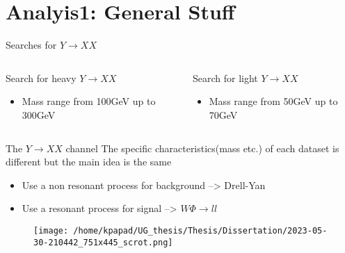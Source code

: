 \documentclass[bigger]{beamer}
\begin{document}
\section{Analyis1: General Stuff}
\label{sec:org932684b}
\begin{frame}[label={sec:org5f145da}]{Searches for \(Y \rightarrow XX\)}
\begin{columns}
\begin{column}{0.5\columnwidth}
Search for heavy \(Y \rightarrow XX\)
\begin{itemize}
\item Mass range from 100GeV up to 300GeV
\end{itemize}
\end{column}
\begin{column}{0.5\columnwidth}
Search for light \(Y \rightarrow XX\)
\begin{itemize}
\item Mass range from 50GeV up to 70GeV
\end{itemize}
\end{column}
\end{columns}
\end{frame}
\begin{frame}[label={sec:org27c5bee}]{The \(Y \rightarrow XX\) channel}
The specific characteristics(mass etc.) of each dataset  is different but the main idea is the same
\begin{itemize}
\item Use a non resonant process for background --> Drell-Yan
\item Use a resonant process for signal --> \(W\Phi \rightarrow ll\)
\end{itemize}
\begin{figure}[hb]
\centering
\texttt{[image: /home/kpapad/UG\_thesis/Thesis/Dissertation/2023-05-30-210442\_751x445\_scrot.png]}
\end{figure}
\end{frame}
\end{document}
